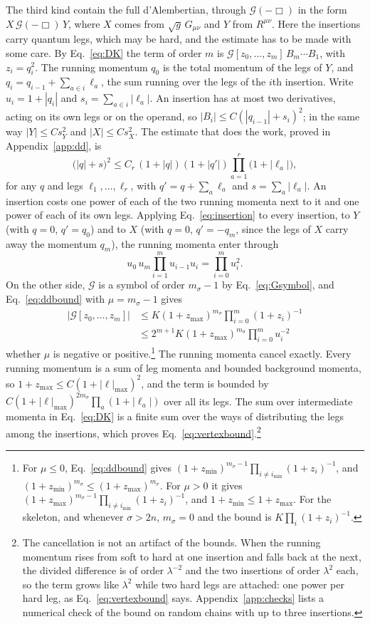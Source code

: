 \documentclass[aps,prd,10pt,twocolumn,superscriptaddress,nofootinbib,floatfix,longbibliography]{revtex4-2}
\begin{document}
The third kind contain the full d'Alembertian, through $\mathcal G(-\Box)$ in the form $X\,\mathcal G(-\Box)\,Y$, where $X$ comes from $\sqrt g\,G_{\mu\nu}$ and $Y$ from $R^{\mu\nu}$. Here the insertions carry quantum legs, which may be hard, and the estimate has to be made with some care. By Eq.~\eqref{eq:DK} the term of order $m$ is $\mathcal G[z_0,\dots,z_m]\,B_m\cdots B_1$, with $z_i=q_i^2$. The running momentum $q_0$ is the total momentum of the legs of $Y$, and $q_i=q_{i-1}+\sum_{a\in i}\ell_a$, the sum running over the legs of the $i$th insertion. Write $u_i=1+|q_i|$ and $s_i=\sum_{a\in i}|\ell_a|$. An insertion has at most two derivatives, acting on its own legs or on the operand, so $|B_i|\le C(|q_{i-1}|+s_i)^2$; in the same way $|Y|\le Cs_Y^2$ and $|X|\le Cs_X^2$. The estimate that does the work, proved in Appendix~\ref{app:dd}, is
\begin{equation}
\label{eq:insertion}
\bigl(|q|+s\bigr)^2\le C_r\,(1+|q|)(1+|q'|)\prod_{a=1}^r\bigl(1+|\ell_a|\bigr),
\end{equation}
for any $q$ and legs $\ell_1,\dots,\ell_r$, with $q'=q+\sum_a\ell_a$ and $s=\sum_a|\ell_a|$. An insertion costs one power of each of the two running momenta next to it and one power of each of its own legs. Applying Eq.~\eqref{eq:insertion} to every insertion, to $Y$ (with $q=0$, $q'=q_0$) and to $X$ (with $q=0$, $q'=-q_m$, since the legs of $X$ carry away the momentum $q_m$), the running momenta enter through
\[
u_0\,u_m\prod_{i=1}^mu_{i-1}u_i=\prod_{i=0}^mu_i^2 .
\]
On the other side, $\mathcal G$ is a symbol of order $m_\sigma-1$ by Eq.~\eqref{eq:Gsymbol}, and Eq.~\eqref{eq:ddbound} with $\mu=m_\sigma-1$ gives
\begin{align*}
|\mathcal G[z_0,\dots,z_m]|&\le K(1+z_{\max})^{m_\sigma}\prod_{i=0}^m(1+z_i)^{-1}\\
&\le2^{m+1}K(1+z_{\max})^{m_\sigma}\prod_{i=0}^mu_i^{-2}
\end{align*}
whether $\mu$ is negative or positive.\footnote{For $\mu\le0$, Eq.~\eqref{eq:ddbound} gives $(1+z_{\min})^{m_\sigma-1}\prod_{i\ne i_{\min}}(1+z_i)^{-1}$, and $(1+z_{\min})^{m_\sigma}\le(1+z_{\max})^{m_\sigma}$. For $\mu>0$ it gives $(1+z_{\max})^{m_\sigma-1}\prod_{i\ne i_{\min}}(1+z_i)^{-1}$, and $1+z_{\min}\le1+z_{\max}$. For the skeleton, and whenever $\sigma>2n$, $m_\sigma=0$ and the bound is $K\prod_i(1+z_i)^{-1}$.} The running momenta cancel exactly. Every running momentum is a sum of leg momenta and bounded background momenta, so $1+z_{\max}\le C(1+|\ell|_{\max})^2$, and the term is bounded by $C(1+|\ell|_{\max})^{2m_\sigma}\prod_a(1+|\ell_a|)$ over all its legs. The sum over intermediate momenta in Eq.~\eqref{eq:DK} is a finite sum over the ways of distributing the legs among the insertions, which proves Eq.~\eqref{eq:vertexbound}.\footnote{The cancellation is not an artifact of the bounds. When the running momentum rises from soft to hard at one insertion and falls back at the next, the divided difference is of order $\lambda^{-2}$ and the two insertions of order $\lambda^2$ each, so the term grows like $\lambda^2$ while two hard legs are attached: one power per hard leg, as Eq.~\eqref{eq:vertexbound} says. Appendix~\ref{app:checks} lists a numerical check of the bound on random chains with up to three insertions.}
\end{document}
